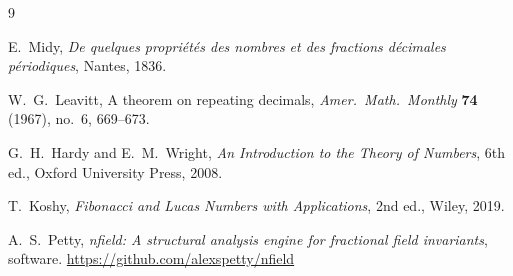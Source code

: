 \documentclass[12pt]{amsart}
\theoremstyle{definition}
\theoremstyle{remark}
\begin{document}
\begin{thebibliography}{9}

E.~Midy,
\emph{De quelques propri\'et\'es des nombres et des fractions
d\'ecimales p\'eriodiques},
Nantes, 1836.

W.~G.~Leavitt,
A theorem on repeating decimals,
\emph{Amer.\ Math.\ Monthly} \textbf{74} (1967), no.~6, 669--673.

G.~H.~Hardy and E.~M.~Wright,
\emph{An Introduction to the Theory of Numbers},
6th ed., Oxford University Press, 2008.

T.~Koshy,
\emph{Fibonacci and Lucas Numbers with Applications},
2nd ed., Wiley, 2019.

A.~S.~Petty,
\emph{nfield: A structural analysis engine for fractional field invariants},
software.
\url{https://github.com/alexspetty/nfield}

\end{thebibliography}
\end{document}
